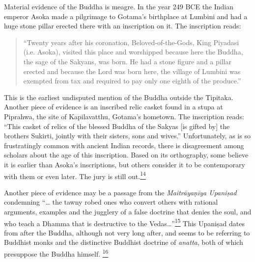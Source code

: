 Material evidence of the Buddha is meagre. In the year 249 BCE the
Indian emperor Asoka made a pilgrimage to Gotama's birthplace at Lumbini
and had a huge stone pillar erected there with an inscription on it. The
inscription reads:

\begin{quote}
``Twenty years after his coronation, Beloved-of-the-Gods, King Piyadasi
(i.e. Asoka), visited this place and worshipped because here the Buddha,
the sage of the Sakyans, was born. He had a stone figure and a pillar
erected and because the Lord was born here, the village of Lumbini was
exempted from tax and required to pay only one eighth of the produce.''
\end{quote}

This is the earliest undisputed mention of the Buddha outside the
Tipitaka. Another piece of evidence is an inscribed relic casket found
in a stupa at Piprahwa, the site of Kapilavatthu, Gotama's hometown. The
inscription reads: ``This casket of relics of the blessed Buddha of the
Sakyas {[}is gifted by{]} the brothers Sukirti, jointly with their
sisters, sons and wives.'' Unfortunately, as is so frustratingly common
with ancient Indian records, there is disagreement among scholars about
the age of this inscription. Based on its orthography, some believe it
is earlier than Asoka's inscriptions, but others consider it to be
contemporary with them or even later. The jury is still
out.\label{footprints_split_005.html_fnref14}\hyperref[footprints_split_024.htmlux5cux23fn14]{\textsuperscript{14}}

Another piece of evidence may be a passage from the \emph{Maitrāyaṇīya
Upaniṣad} condemning ``\ldots{} the tawny robed ones who convert others
with rational arguments, examples and the jugglery of a false doctrine
that denies the soul, and who teach a Dhamma that is destructive to the
Vedas\ldots''\label{footprints_split_005.html_fnref15}\hyperref[footprints_split_024.htmlux5cux23fn15]{\textsuperscript{15}}
This Upaniṣad dates from after the Buddha, although not very long after,
and seems to be referring to Buddhist monks and the distinctive Buddhist
doctrine of \emph{anatta}, both of which presuppose the Buddha himself.
\label{footprints_split_005.html_fnref16}\hyperref[footprints_split_024.htmlux5cux23fn16]{\textsuperscript{16}}

